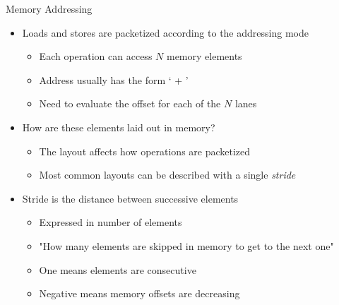 \begin{frame}{Memory Addressing}

\begin{itemize}
    \item Loads and stores are packetized according to the addressing mode
    \begin{itemize}
        \item Each operation can access $N$ memory elements
        \item Address usually has the form ` + '
        \item Need to evaluate the offset for each of the $N$ lanes
    \end{itemize}
    
    \item How are these elements laid out in memory?
    \begin{itemize}
        \item The layout affects how operations are packetized
        \item Most common layouts can be described with a single \emph{stride}
    \end{itemize}
    
    \item Stride is the distance between successive elements
    \begin{itemize}
        \item Expressed in number of elements
        \item "How many elements are skipped in memory to get to the next one"
        \item One means elements are consecutive
        \item Negative means memory offsets are decreasing
    \end{itemize}
    
    
\end{itemize}

\end{frame}

